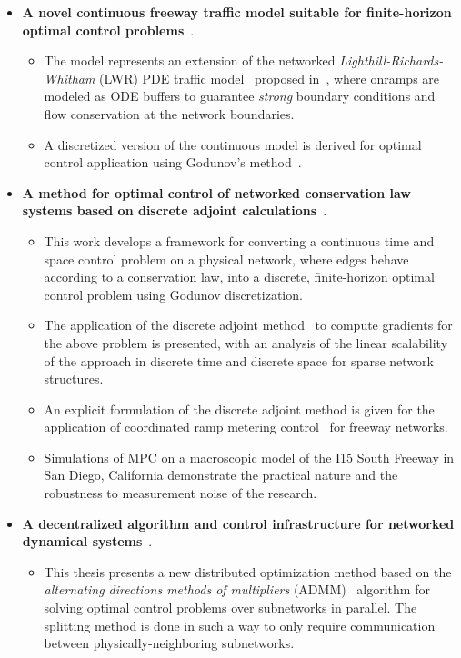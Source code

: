 \begin{itemize}
	\item \textbf{A novel continuous freeway traffic model suitable for finite-horizon optimal control problems}~\cite{delle2014pde,Reilly2013b}.
	\begin{itemize}
		\item The model represents an extension of the networked \emph{Lighthill-Richards-Whitham} (LWR) PDE traffic model~\cite{lighthill1955kinematic,richards1956shock} proposed in~\cite{garavello2006traffic}, where onramps are modeled as ODE buffers to guarantee \emph{strong} boundary conditions and flow conservation at the network boundaries.
		\item A discretized version of the continuous model is derived for optimal control application using Godunov's method~\cite{godunov1959,lebacque1996godunov}.
	\end{itemize}
	\item \textbf{A method for optimal control of networked conservation law systems based on discrete adjoint calculations}~\cite{Reilly2013b,Samaranayake2014}.
	\begin{itemize}
		\item This work develops a framework for converting a continuous time and space control problem on a physical network, where edges behave according to a conservation law, into a discrete, finite-horizon optimal control problem using Godunov discretization.
		\item The application of the discrete adjoint method~\cite{Giles2000,Duffy2009,Apice2010Modeling,Gugat2005} to compute gradients for the above problem is presented, with an analysis of the linear scalability of the approach in discrete time and discrete space for sparse network structures.
		\item An explicit formulation of the discrete adjoint method is given for the application of coordinated ramp metering control~\cite{Papageorgiou1991,Frejo2011,Kotsialos2004,gomes2006optimal} for freeway networks.
		\item Simulations of MPC on a macroscopic model of the I15 South Freeway in San Diego, California demonstrate the practical nature and the robustness to measurement noise of the research.
	\end{itemize}
	\item \textbf{A decentralized algorithm and control infrastructure for networked dynamical systems}~\cite{Reilly2014b}.
	\begin{itemize}
		\item This thesis presents a new distributed optimization method based on the \emph{alternating directions methods of multipliers} (ADMM)~\cite{Boyd2010a,gabay1976dual,mota2012distributed} algorithm for solving  optimal control problems over subnetworks in parallel. The splitting method is done in such a way to only require communication between physically-neighboring subnetworks.

\end{itemize}
\end{itemize}
